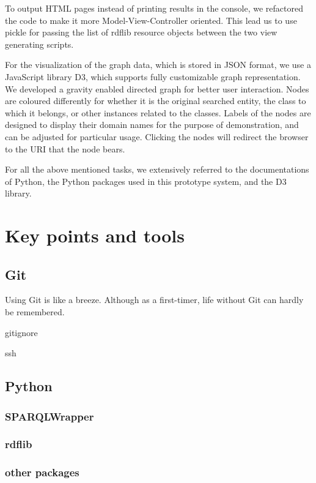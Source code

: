 \documentclass[12pt]{cls}
\begin{document}
To output HTML pages instead of printing results in the console, we refactored the code to make it more Model-View-Controller oriented. This lead us to use pickle for passing the list of rdflib resource objects between the two view generating scripts.

For the visualization of the graph data, which is stored in JSON format, we use a JavaScript library D3, which supports fully customizable graph representation. We developed a gravity enabled directed graph for better user interaction. Nodes are coloured differently for whether it is the original searched entity, the class to which it belongs, or other instances related to the classes. Labels of the nodes are designed to display their domain names for the purpose of demonstration, and can be adjusted for particular usage. Clicking the nodes will redirect the browser to the URI that the node bears.

For all the above mentioned tasks, we extensively referred to the documentations of Python, the Python packages used in this prototype system, and the D3 library. 

\chapter{Key points and tools}

\section{Git}

Using Git is like a breeze. Although as a first-timer, life without Git can hardly be remembered.

gitignore

ssh

\section{Python}

\subsection{SPARQLWrapper}

\subsection{rdflib}

\subsection{other packages}
\end{document}
